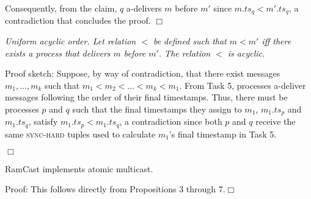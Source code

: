 Consequently, from the claim, $q$ a-delivers $m$ before $m'$ since $m.ts_q < m'.ts_q$, a contradiction that concludes the proof.
\hfill$\Box$

\begin{proposition}
\textit{Uniform acyclic order.
Let relation $<$ be defined such that $m < m'$ iff there exists a process that delivers $m$ before $m'$.
The relation $<$ is acyclic.}
\end{proposition}
\noindent
{\sc Proof sketch:} 
Suppose, by way of contradiction, that there exist messages $m_1, ..., m_k$ such that $m_1 < m_2 < ... < m_k < m_1$. 
From Task 5, processes a-deliver messages following the order of their final timestamps.
Thus, there must be processes $p$ and $q$ such that the final timestamps they assign to $m_1$, $m_1.ts_p$ and  $m_1.ts_q$, satisfy $m_1.ts_p < m_1.ts_q$, a contradiction since both $p$ and $q$ receive the same \textsc{sync-hard} tuples used to calculate $m_1$'s final timestamp in Task 5.


\hfill$\Box$

\begin{theorem}
RamCast implements atomic multicast.
\end{theorem}
\noindent
{\sc Proof:} 
This follows directly from Propositions 3 through 7.\hfill$\Box$


